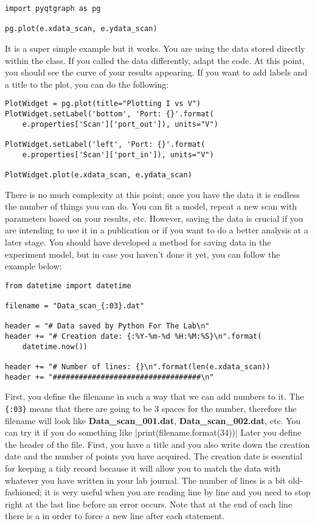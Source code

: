 \begin{verbatim}
import pyqtgraph as pg

pg.plot(e.xdata_scan, e.ydata_scan)
\end{verbatim}

It is a super simple example but it works. You are using the data stored
directly within the class. If you called the data differently, adapt the
code. At this point, you should see the curve of your results appearing.
If you want to add labels and a title to the plot, you can do
the following:

\begin{verbatim}
PlotWidget = pg.plot(title="Plotting I vs V")
PlotWidget.setLabel('bottom', 'Port: {}'.format(
    e.properties['Scan']['port_out']), units="V")
    
PlotWidget.setLabel('left', 'Port: {}'.format(
    e.properties['Scan']['port_in']), units="V")
    
PlotWidget.plot(e.xdata_scan, e.ydata_scan)
\end{verbatim}

There is no much complexity at this point; once you have the data it is
endless the number of things you can do. You can fit a model, repeat a
new scan with parameters based on your results, etc. However, saving the
data is crucial if you are intending to use it in a publication or if
you want to do a better analysis at a later stage. You should have
developed a method for saving data in the experiment model, but in case
you haven't done it yet, you can follow the example below:

\begin{verbatim}
from datetime import datetime

filename = "Data_scan_{:03}.dat"

header = "# Data saved by Python For The Lab\n"
header += "# Creation date: {:%Y-%m-%d %H:%M:%S}\n".format(
    datetime.now())

header += "# Number of lines: {}\n".format(len(e.xdata_scan))
header += "##################################\n"
\end{verbatim}

First, you define the filename in such a way that we can add numbers to
it. The \texttt{\{:03\}} means that there are going to be 3 spaces for
the number, therefore the filename will look like
\textbf{Data\_scan\_001.dat}, \textbf{Data\_scan\_002.dat}, etc. You can
try it if you do something like |print(filename.format(34))|
Later you define the header of the file. First, you have a title and you
also write down the creation date and the number of points you have
acquired. The creation date is essential for keeping a tidy record
because it will allow you to match the data with whatever you have
written in your lab journal. The number of lines is a bit old-fashioned;
it is very useful when you are reading line by line and you need to stop
right at the last line before an error occurs. Note that at the end of
each line there is a \texttt{\n} in order to force a new
line after each statement.


